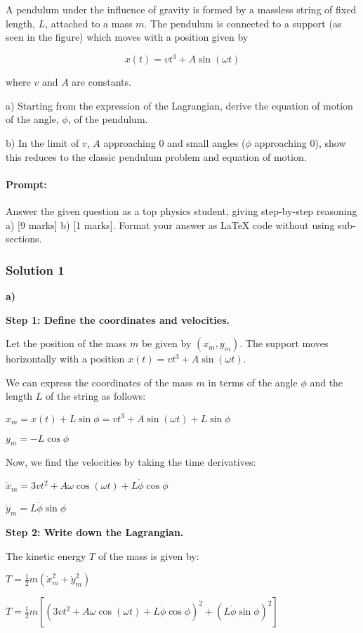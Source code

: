 \documentclass{article}
\begin{document}
A pendulum under the influence of gravity is formed by a massless string of fixed length, $L$, attached
to a mass $m$. The pendulum is connected to a support (as seen in the figure) which moves with a
position given by

$$x(t) = vt^3 + A \sin(\omega t)$$

where $v$ and $A$ are constants.

a) Starting from the expression of the Lagrangian, derive the equation of motion of the angle, $\phi$,
of the pendulum.

b) In the limit of $v$, $A$ approaching 0 and small angles ($\phi$ approaching 0), show this reduces to the
classic pendulum problem and equation of motion.

\paragraph{Prompt: \\} 
Answer the given question as a top physics student, giving step-by-step reasoning a) [9 marks] b) [1 marks]. Format your answer as LaTeX code without using sub-sections.

\subsubsection{Solution 1}
\textbf{a)}

\textbf{Step 1: Define the coordinates and velocities.}

Let the position of the mass $m$ be given by $(x_m, y_m)$.
The support moves horizontally with a position $x(t) = vt^3 + A\sin(\omega t)$.

We can express the coordinates of the mass $m$ in terms of the angle $\phi$ and the length $L$ of the string as follows:

$x_m = x(t) + L\sin\phi = vt^3 + A\sin(\omega t) + L\sin\phi$

$y_m = -L\cos\phi$

Now, we find the velocities by taking the time derivatives:

$\dot{x}_m = 3vt^2 + A\omega\cos(\omega t) + L\dot{\phi}\cos\phi$

$\dot{y}_m = L\dot{\phi}\sin\phi$

\textbf{Step 2: Write down the Lagrangian.}

The kinetic energy $T$ of the mass is given by:

$T = \frac{1}{2}m(\dot{x}_m^2 + \dot{y}_m^2)$

$T = \frac{1}{2}m[(3vt^2 + A\omega\cos(\omega t) + L\dot{\phi}\cos\phi)^2 + (L\dot{\phi}\sin\phi)^2]$
\end{document}
